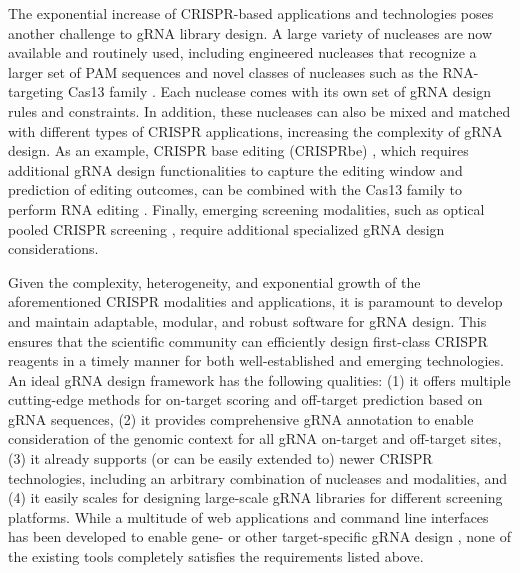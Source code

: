 \documentclass[pdftex,english,10pt]{article}
\begin{document}
The exponential increase of CRISPR-based applications and technologies poses another challenge to gRNA library design.
A large variety of nucleases are now available and routinely used, including engineered nucleases that recognize a larger set of PAM sequences  \citep{xcas9,spcas9ng, spg, enpamgb} and novel classes of nucleases such as the RNA-targeting Cas13 family \citep{c2c2_1, c2c2_2,cas13d}. Each nuclease comes with its own set of gRNA design rules and constraints. In addition, these nucleases can also be mixed and matched with different types of CRISPR applications, increasing the complexity of gRNA design. As an example, CRISPR base editing (CRISPRbe) \citep{gaudelli,komor}, which requires additional gRNA design functionalities to capture the editing window and prediction of editing outcomes, can be combined with the Cas13 family to perform RNA editing \citep{rnaediting1}. Finally, emerging screening modalities, such as optical pooled CRISPR screening \citep{ops}, require additional specialized gRNA design considerations. 


Given the complexity, heterogeneity, and exponential growth of the aforementioned CRISPR modalities and applications, it is paramount to develop and maintain adaptable, modular, and robust software for gRNA design. This ensures that the scientific community can efficiently design first-class CRISPR reagents in a timely manner for both well-established and emerging technologies. An ideal gRNA design framework has the following qualities: (1) it offers multiple cutting-edge methods for on-target scoring and off-target prediction based on gRNA sequences, (2) it provides comprehensive gRNA annotation to enable consideration of the genomic context for all gRNA on-target and off-target sites, (3) it already supports (or can be easily extended to) newer CRISPR technologies, including an arbitrary combination of nucleases and modalities, and (4) it easily scales for designing large-scale gRNA libraries for different screening platforms. While a multitude of web applications and command line interfaces has been developed to enable gene- or other target-specific gRNA design \citep{ecrisp,crisprscan,guidescan,casoffinder, chopchop, crispor, cctop, flashfry,cld,multicrispr, crisprseek}, none of the existing tools completely satisfies the requirements listed above.
\end{document}
